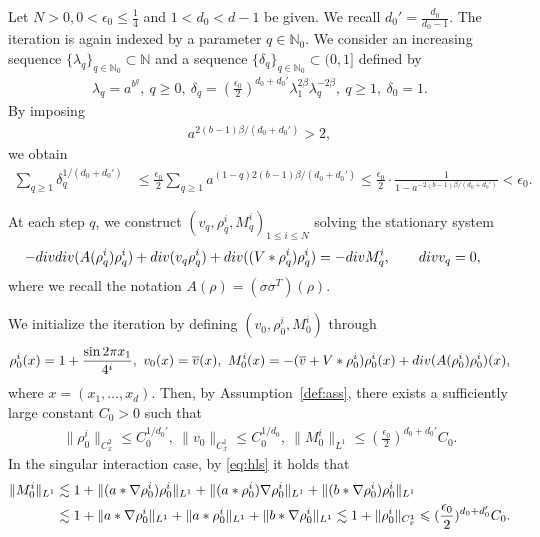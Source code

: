 \documentclass[10pt,a4paper]{amsart}
\numberwithin{equation}{section}
\def\geq{\geqslant}
\def\leq{\leqslant}
\def\div{\mathord{{\rm div}}}
\def\geq{\geqslant}
\def\leq{\leqslant}
\def\div{\mathord{{\rm div}}}
\begin{document}
Let $N>0,0<\epsilon_0\leq \frac14$ and $1<d_0<d-1$ be given. We recall $d_0'=\frac{d_0}{d_0-1}$. The iteration is again indexed by a parameter
$
q\in\mathbb{N}_0.
$
We consider an increasing sequence
$
\{\lambda_q\}_{q\in\mathbb{N}_0}\subset\mathbb{N}
$
and a sequence
$
\{\delta_q\}_{q\in\mathbb{N}_0}\subset(0,1]
$
defined  by \begin{align*}
\lambda_q
=
a^{b^q},
\ 
q\geq0,
\ 
\delta_q
=
(\frac{\epsilon_0}{2})^{d_0+d_0'}
\lambda_1^{2\beta}
\lambda_q^{-2\beta},
\ 
q\geq1,
\ 
\delta_0=1.
\end{align*}  By imposing
\begin{align}
a^{2(b-1)\beta/(d_0+d_0')}>2,
\label{ieq:5ab2}
\end{align}
we obtain
\begin{align*}
\sum_{q\geq1}\delta_q^{1/(d_0+d_0')}
&\leq
\frac{\epsilon_0}{2} 
\sum_{q\geq1}
a^{(1-q)2(b-1)\beta/(d_0+d_0')}\leq
\frac{\epsilon_0}{2}
\cdot
\frac1{1-a^{-2(b-1)\beta/(d_0+d_0')}}
<
\epsilon_0.
\end{align*}

At each step $q$, we construct  
$
(v_q,\rho^i_q,M^i_q)_{1\leq i\leq N}
$
solving the stationary system
\begin{align}
-\div\div(A(\rho^i_q)\rho^i_q)
+
\div(v_q\rho^i_q)+\div((V*\rho_q^i)\rho_q^i)
&=
-\div M^i_q,
\qquad
\div v_q=0,
\label{eq:5qth}
\end{align}
where we recall the notation
$
A(\rho)=(\sigma\sigma^T)(\rho).
$
 

We initialize the iteration by defining
$
(v_0,\rho^i_0,M^i_0)
$
through
\begin{align*}
\rho^i_0(x)
=
1+\frac{\sin 2\pi x_1}{4^i},
\ 
v_0(x)=\overline v(x),
\ 
M^i_0(x)
=-(\overline v+V*\rho_0^i)\rho^i_0(x)+\div(
A(\rho^i_0)\rho^i_0)(x),
\end{align*}
where
$
x=(x_1,\dots,x_d).
$
Then, by Assumption~\ref{def:ass}, there exists a sufficiently large constant $C_0>0$ such that
\begin{align}
\|\rho^i_0\|_{C_x^2}
\leq
C_0^{1/d_0'},\ \|v_0\|_{C_{x}^1}\leq C_0^{1/d_0},\ 
\|M^i_0\|_{L^1}
\leq
(\frac{\epsilon_0}{2})^{d_0+d_0'}C_0.
\label{bd:5rho_0,M_0}
\end{align}
In the singular interaction  case, by \eqref{eq:hls} it holds that 
 \begin{align}
    \| M^i_0\|_{L^1}&\lesssim 1+\|(a*\nabla \rho_0^i)\rho_0^i\|_{L^1}+\|(a*
\rho^i_0)\nabla \rho^i_0\|_{L^1}+\|(b*\nabla
\rho^i_0)  \rho^i_0\|_{L^1}\notag\\
&\lesssim 1+\|a*\nabla \rho_0^i\|_{L^1}+\|a*
\rho^i_0\|_{L^1}+\|b*\nabla
\rho^i_0\|_{L^1} \lesssim 1+\|\rho^i_0\|_{C_x^1}\leq
(\frac{\epsilon_0}{2})^{d_0+d_0'}C_0.\label{bd:5rho_0,M_02}
 \end{align}
 
\end{document}
